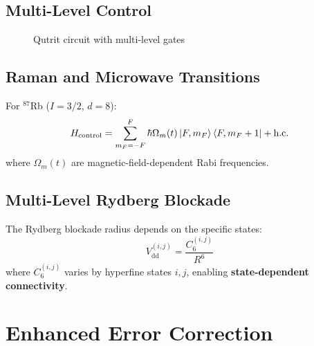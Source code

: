 \documentclass[12pt,twocolumn]{article}
\begin{document}
\subsection{Multi-Level Control}
\begin{figure}[H]
\centering
{}
\caption{Qutrit circuit with multi-level gates}
\label{fig:qutrit_circuit}
\end{figure}


\subsection{Raman and Microwave Transitions}
For $^{87}$Rb ($I=3/2$, $d=8$):
\[
H_{\text{control}} = \sum_{m_F=-F}^{F} \hbar \Omega_m(t) \ket{F,m_F}\bra{F,m_F+1} + \text{h.c.}
\]
where $\Omega_m(t)$ are magnetic-field-dependent Rabi frequencies.

\subsection{Multi-Level Rydberg Blockade}
The Rydberg blockade radius depends on the specific states:
\[
V_{\text{dd}}^{(i,j)} = \frac{C_6^{(i,j)}}{R^6}
\]
where $C_6^{(i,j)}$ varies by hyperfine states $i,j$, enabling \textbf{state-dependent connectivity}.

\section{Enhanced Error Correction}
\end{document}
